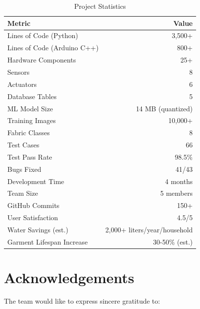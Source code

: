\begin{table}[H]
    \centering
    \small
    \begin{tabular}{|l|r|}
        \hline
        \textbf{Metric} & \textbf{Value} \\
        \hline
        Lines of Code (Python) & 3,500+ \\
        \hline
        Lines of Code (Arduino C++) & 800+ \\
        \hline
        Hardware Components & 25+ \\
        \hline
        Sensors & 8 \\
        \hline
        Actuators & 6 \\
        \hline
        Database Tables & 5 \\
        \hline
        ML Model Size & 14 MB (quantized) \\
        \hline
        Training Images & 10,000+ \\
        \hline
        Fabric Classes & 8 \\
        \hline
        Test Cases & 66 \\
        \hline
        Test Pass Rate & 98.5\% \\
        \hline
        Bugs Fixed & 41/43 \\
        \hline
        Development Time & 4 months \\
        \hline
        Team Size & 5 members \\
        \hline
        GitHub Commits & 150+ \\
        \hline
        User Satisfaction & 4.5/5 \\
        \hline
        Water Savings (est.) & 2,000+ liters/year/household \\
        \hline
        Garment Lifespan Increase & 30-50\% (est.) \\
        \hline
    \end{tabular}
    \caption{Project Statistics}
    \label{tab:stats}
\end{table}

\section{Acknowledgements}
The team would like to express sincere gratitude to:

